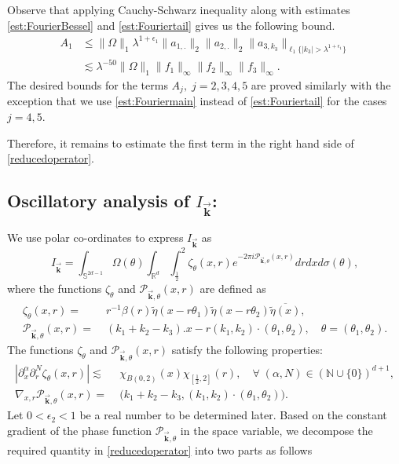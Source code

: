 \documentclass[a4paper,reqno]{amsart}
\newcommand{\R}{{\mathbb R}}       %
\newcommand{\N}{{\mathbb N}}
\newcommand{\Sp}{{\mathbb S}}
\theoremstyle{definition}
\numberwithin{equation}{section}
\begin{document}
Observe that applying Cauchy-Schwarz inequality along with estimates \eqref{est:FourierBessel} and \eqref{est:Fouriertail} gives us the following bound. 
\begin{align*}A_1&\leq\|\Omega\|_1\lambda^{1+\epsilon_1}\|a_{1,.}\|_2\|a_{2,.}\|_2\|a_{3,k_3}\|_{\ell_1\{|k_3|>\lambda^{1+\epsilon_1}\}}\\
	&\lesssim\lambda^{-50}\|\Omega\|_1\|f_1\|_\infty\|f_2\|_\infty\|f_3\|_\infty.
	\end{align*}
The desired bounds for the terms $A_j,\;j=2,3,4,5$ are proved similarly with the exception that we use \eqref{est:Fouriermain} instead of \eqref{est:Fouriertail} for the cases $j=4,5$.

Therefore, it remains to estimate the first term in the right hand side of \eqref{reducedoperator}.
\subsection{Oscillatory analysis of $I_{\vec{\mathbf{k}}}$:} We use polar co-ordinates to express $I_{\vec{\mathbf{k}}}$ as
\begin{equation}\label{polarI}
I_{\vec{\mathbf{k}}}=\int_{\Sp^{2d-1}}\Omega(\theta)\int_{\R^d}\int_{\frac{1}{2}}^2\zeta_{\theta}(x,r)e^{-2\pi i\mathcal{P}_{\vec{\mathbf{k}},\theta}(x,r)}drdxd\sigma(\theta),
\end{equation}
where the functions $\zeta_{\theta}$ and $\mathcal{P}_{\vec{\mathbf{k}},\theta}(x,r)$ are defined as
\begin{align*}
	\zeta_{\theta}(x,r)=&\;r^{-1}\beta(r)\widetilde\eta(x-r\theta_1)\widetilde\eta(x-r\theta_2)\overline{\widetilde\eta(x)},\\
	\mathcal{P}_{\vec{\mathbf{k}},\theta}(x,r)=&\;(k_1+k_2-k_3).x-r(k_1,k_2)\cdot(\theta_1,\theta_2),\quad\theta=(\theta_1,\theta_2).
\end{align*}
The functions $\zeta_{\theta}$ and $\mathcal{P}_{\vec{\mathbf{k}},\theta}(x,r)$ satisfy the following properties:
\begin{align}
	|\partial^\alpha_x\partial^N_r\zeta_{\theta}(x,r)|\lesssim&\;\chi_{B(0,2)}(x)\chi_{[\frac{1}{2},2]}(r),\quad\forall\;(\alpha,N)\in(\N\cup\{0\})^{d+1},\label{integrand}\\
	\nabla_{x,r}\mathcal{P}_{\vec{\mathbf{k}},\theta}(x,r)=&\;\big(k_1+k_2-k_3,(k_1,k_2)\cdot(\theta_1,\theta_2)\big).\label{phase}
\end{align}
Let $0<\epsilon_2<1$ be a real number to be determined later. Based on the constant gradient of the phase function $\mathcal{P}_{\vec{\mathbf{k}},\theta}$ in the space variable, we decompose the required quantity in \eqref{reducedoperator} into two parts as follows
\end{document}
